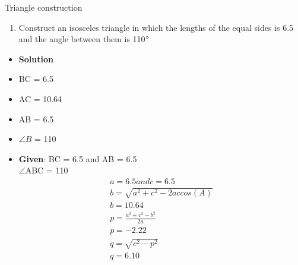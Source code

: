 \begin{frame}{Triangle construction}
\begin{enumerate}
\conti
\item Construct an isosceles triangle in which the lengths of the equal sides is 6.5 and the angle between them is 110$\degree$
\seti
\end{enumerate}
\begin{itemize}
\item\textbf{Solution}\\

\item BC = 6.5 \item AC = 10.64
\item AB = 6.5\\
\item $\angle B$ = 110\\ 
\end{itemize}
\end{frame}
\begin{frame}
\begin{itemize}
\item\textbf{Given}: BC = 6.5 and AB = 6.5\\
$\angle$ABC = 110
\begin{align*}
a = 6.5 and  c = 6.5\\
b = \sqrt{a^2 + c^2 - 2ac cos(A)}\\
b= 10.64\\
p=\frac{a^2 + c^2 - b^2}{2a}\\
p=-2.22\\
q=\sqrt{c^2 - p^ 2}\\
q = 6.10
\end{align*}
\end{itemize}
\end{frame}

